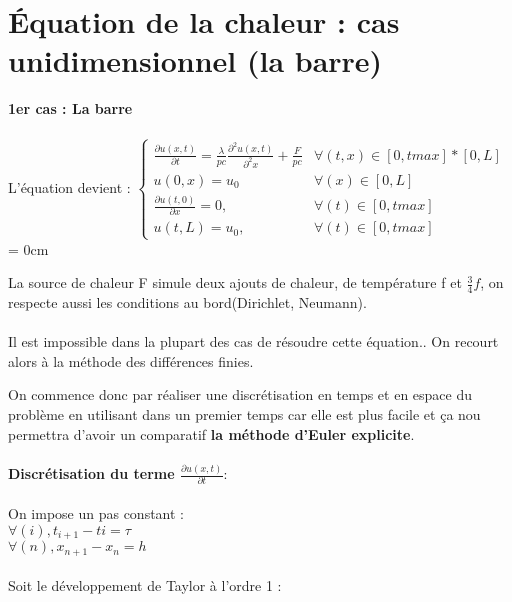 \documentclass[french]{report}
\begin{document}
\section{Équation de la chaleur : cas unidimensionnel (la barre)} 
\textbf{1er cas : La barre}\\\\
L’équation devient :
\bigbreak
$\begin{cases}
\frac{\partial u(x,t)}{\partial t} =\frac{\lambda}{pc} \frac{\partial^2 u(x,t)}{\partial^2 x} + \frac{F}{pc} &\forall(t,x) \in [0,tmax]*[0,L] \\
u(0,x) = u_0 &\forall(x) \in [0,L]
\\
\frac{\partial u(t,0)}{\partial x} = 0, &\forall(t) \in [0,tmax]
\\
u(t,L)=u_0, &\forall(t) \in [0,tmax]
\end{cases}$
\leftskip=3cm
\bigbreak
\leftskip = 0cm 

La source de chaleur F simule deux ajouts de chaleur,
de température f et $\frac{3}{4}f$, on respecte aussi les conditions au bord(Dirichlet, Neumann).\\\\

Il est impossible dans la plupart des cas de résoudre cette équation.. On recourt alors à la méthode des différences finies. 

On commence donc par réaliser une discrétisation en temps et en espace du problème en utilisant dans un premier temps car elle est plus facile et ça nou permettra d'avoir un comparatif \textbf{la méthode d'Euler explicite}.\\\\
\textbf{Discrétisation du terme $\frac{\partial u(x,t)}{\partial t}$}:\\\\
On impose un pas constant :\\
$\forall(i), t_{i+1} - t{i} = \tau$ \\
$\forall(n), x_{n+1} - x_{n} = h $ \\\\
Soit le développement de Taylor à l'ordre 1 :\\
\end{document}

